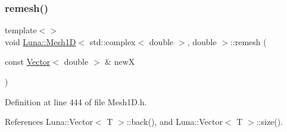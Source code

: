 \mbox{\label{classLuna_1_1Mesh1D_a256e7318b0f42a43d2d9f803b452e625}} 
\subsubsection{\texorpdfstring{remesh()}{remesh()}\hspace{0.1cm}{\footnotesize\ttfamily [3/4]}}
{\footnotesize\ttfamily template$<$$>$ \\
void \hyperlink{classLuna_1_1Mesh1D}{Luna\+::\+Mesh1D}$<$ std\+::complex$<$ double $>$, double $>$\+::remesh (\begin{DoxyParamCaption}\item[{const \hyperlink{classLuna_1_1Vector}{Vector}$<$ double $>$ \&}]{newX }\end{DoxyParamCaption})\hspace{0.3cm}{\ttfamily [inline]}}



Definition at line 444 of file Mesh1\+D.\+h.



References Luna\+::\+Vector$<$ T $>$\+::back(), and Luna\+::\+Vector$<$ T $>$\+::size().


